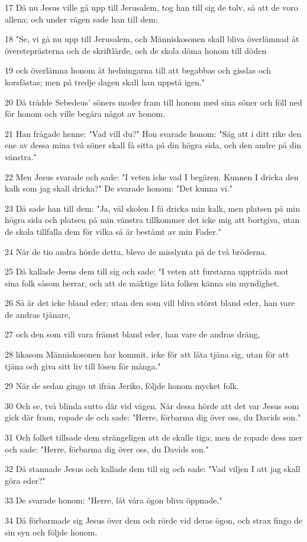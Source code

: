 \par 17 Då nu Jesus ville gå upp till Jerusalem, tog han till sig de tolv, så att de voro allena; och under vägen sade han till dem:
\par 18 "Se, vi gå nu upp till Jerusalem, och Människosonen skall bliva överlämnad åt översteprästerna och de skriftlärde, och de skola döma honom till döden
\par 19 och överlämna honom åt hedningarna till att begabbas och gisslas och korsfästas; men på tredje dagen skall han uppstå igen."
\par 20 Då trädde Sebedeus' söners moder fram till honom med sina söner och föll ned för honom och ville begära något av honom.
\par 21 Han frågade henne: "Vad vill du?" Hon svarade honom: "Säg att i ditt rike den ene av dessa mina två söner skall få sitta på din högra sida, och den andre på din vänstra."
\par 22 Men Jesus svarade och sade: "I veten icke vad I begären. Kunnen I dricka den kalk som jag skall dricka?" De svarade honom: "Det kunna vi."
\par 23 Då sade han till dem: "Ja, väl skolen I få dricka min kalk, men platsen på min högra sida och platsen på min vänstra tillkommer det icke mig att bortgiva, utan de skola tillfalla dem för vilka så är bestämt av min Fader."
\par 24 När de tio andra hörde detta, blevo de misslynta på de två bröderna.
\par 25 Då kallade Jesus dem till sig och sade: "I veten att furstarna uppträda mot sina folk såsom herrar, och att de mäktige låta folken känna sin myndighet.
\par 26 Så är det icke bland eder; utan den som vill bliva störst bland eder, han vare de andras tjänare,
\par 27 och den som vill vara främst bland eder, han vare de andras dräng,
\par 28 likasom Människosonen har kommit, icke för att låta tjäna sig, utan för att tjäna och giva sitt liv till lösen för många."
\par 29 När de sedan gingo ut ifrån Jeriko, följde honom mycket folk.
\par 30 Och se, två blinda sutto där vid vägen. När dessa hörde att det var Jesus som gick där fram, ropade de och sade: "Herre, förbarma dig över oss, du Davids son."
\par 31 Och folket tillsade dem strängeligen att de skulle tiga; men de ropade dess mer och sade: "Herre, förbarma dig över oss, du Davids son."
\par 32 Då stannade Jesus och kallade dem till sig och sade: "Vad viljen I att jag skall göra eder?"
\par 33 De svarade honom: "Herre, låt våra ögon bliva öppnade."
\par 34 Då förbarmade sig Jesus över dem och rörde vid deras ögon, och strax fingo de sin syn och följde honom.

